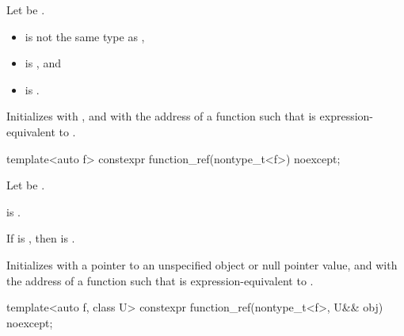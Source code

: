 \begin{itemdescr}
\pnum
Let  be .

\pnum
\constraints
\begin{itemize}
\item {} is not the same type as ,
\item {} is , and
\item {} is .
\end{itemize}

\pnum
\effects
Initializes
 with , and
 with the address of a function 
such that
is expression-equivalent to
.
\end{itemdescr}

%
\begin{itemdecl}
template<auto f> constexpr function_ref(nontype_t<f>) noexcept;
\end{itemdecl}

\begin{itemdescr}
\pnum
Let  be .

\pnum
\constraints
{} is .

\pnum
\mandates
If  is ,
then  is .

\pnum
\effects
Initializes
 with a pointer to an unspecified object or
null pointer value, and
 with the address of a function 
such that
is expression-equivalent to
.
\end{itemdescr}

%
\begin{itemdecl}
template<auto f, class U>
  constexpr function_ref(nontype_t<f>, U&& obj) noexcept;
\end{itemdecl}

